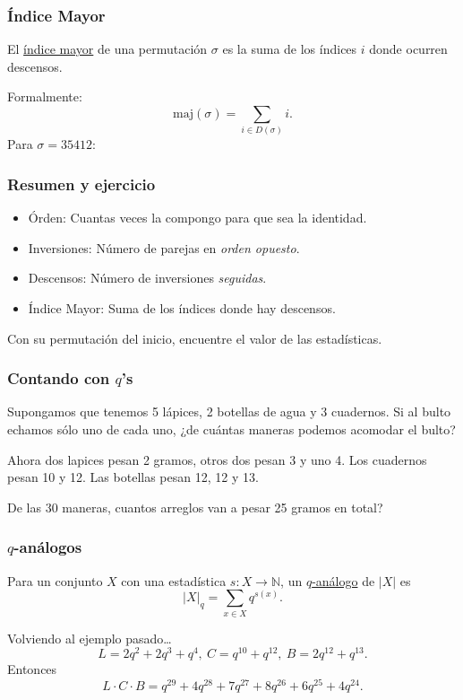 \documentclass[grey]{beamer}
\newcommand{\sg}{\sigma}
\newcommand{\bN}{\mathbb{N}}
\newcommand{\maj}{\text{maj}}
\begin{document}
\begin{frame}[t]\frametitle{Índice Mayor}
  \begin{definition}
    El \underline{índice mayor} de una permutación $\sg$ es la suma de los índices $i$ donde ocurren descensos.
  \end{definition}\pause
  Formalmente:
  $$\maj(\sg)=\sum_{i\in D(\sg)}i.$$\pause
  Para $\sg=35412$:
\end{frame}

\begin{frame}[t]\frametitle{Resumen y ejercicio}
  \begin{itemize}
    \itemsep=0.5em
    \item Órden: Cuantas veces la compongo para que sea la identidad.
    \item Inversiones: Número de parejas en \emph{orden opuesto}.
    \item Descensos: Número de inversiones \emph{seguidas}.
    \item Índice Mayor: Suma de los índices donde hay descensos.
  \end{itemize}\pause
  Con su permutación del inicio, encuentre el valor de las estadísticas.
\end{frame}

\begin{frame}[t]\frametitle{Contando con $q$'s}
\begin{example}
  Supongamos que tenemos 5 lápices, 2 botellas de agua y 3 cuadernos. Si al bulto echamos sólo uno de cada uno, ¿de cuántas maneras podemos acomodar el bulto?
\end{example}\pause 
\begin{example}
  Ahora dos lapices pesan 2 gramos, otros dos pesan 3 y uno 4. Los cuadernos pesan 10 y 12. Las botellas pesan 12, 12 y 13.\par 
  De las 30 maneras, cuantos arreglos van a pesar 25 gramos en total?
\end{example}

\end{frame}

\begin{frame}[t]\frametitle{$q$-análogos}
\begin{definition}
  Para un conjunto $X$ con una estadística $s: X\to\bN$, un \underline{$q$-análogo} de $|X|$ es 
  $$|X|_q=\sum_{x\in X} q^{s(x)}.$$
\end{definition}\pause 
Volviendo al ejemplo pasado\dots
$$L=2q^2+2q^3+q^4,\ C=q^{10}+q^{12},\ B=2q^{12}+q^{13}.$$\pause
Entonces 
$$L\cdot C\cdot B=q^{29} + 4 q^{28} + 7 q^{27} + 8 q^{26} + 6 q^{25} + 4 q^{24}.$$
\end{frame}
\end{document}
